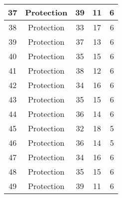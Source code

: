 \documentclass[results.tex]{subfiles}
\begin{document}
\begin{center}
\begin{tabular}{| c || c | c | c | c |}
            \hline
            37                      & Protection                   & 39                     & 11                      & 6                    \\
            \hline
            38                      & Protection                   & 33                     & 17                      & 6                    \\
            \hline
            39                      & Protection                   & 37                     & 13                      & 6                    \\
            \hline
            40                      & Protection                   & 35                     & 15                      & 6                    \\
            \hline
            41                      & Protection                   & 38                     & 12                      & 6                    \\
            \hline
            42                      & Protection                   & 34                     & 16                      & 6                    \\
            \hline
            43                      & Protection                   & 35                     & 15                      & 6                    \\
            \hline
            44                      & Protection                   & 36                     & 14                      & 6                    \\
            \hline
            45                      & Protection                   & 32                     & 18                      & 5                    \\
            \hline
            46                      & Protection                   & 36                     & 14                      & 5                    \\
            \hline
            47                      & Protection                   & 34                     & 16                      & 6                    \\
            \hline
            48                      & Protection                   & 35                     & 15                      & 6                    \\
            \hline
            49                      & Protection                   & 39                     & 11                      & 6                    \\
            \hline
        \end{tabular}
    \end{center}
\end{document}

